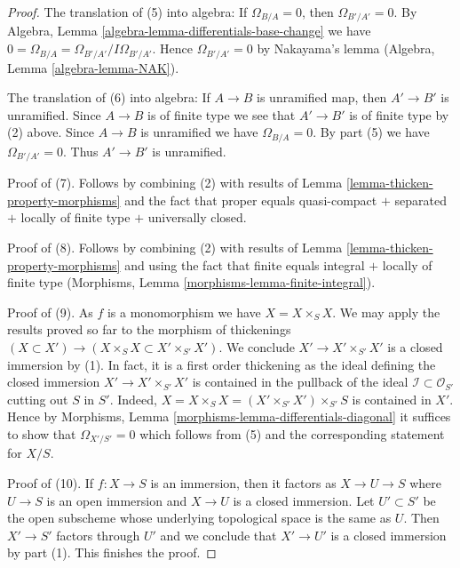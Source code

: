 \documentclass[10pt,a4paper]{amsart}
\theoremstyle{plain}
\theoremstyle{definition}
\theoremstyle{remark}
\numberwithin{equation}{subsection}
\begin{document}
\begin{proof}
\medskip\noindent
The translation of (5) into algebra: If $\Omega_{B/A} = 0$, then
$\Omega_{B'/A'} = 0$. By
Algebra, Lemma \ref{algebra-lemma-differentials-base-change}
we have $0 = \Omega_{B/A} = \Omega_{B'/A'}/I\Omega_{B'/A'}$.
Hence $\Omega_{B'/A'} = 0$ by
Nakayama's lemma (Algebra, Lemma \ref{algebra-lemma-NAK}).

\medskip\noindent
The translation of (6) into algebra: If $A \to B$ is unramified
map, then $A' \to B'$ is unramified. Since $A \to B$ is of finite
type we see that $A' \to B'$ is of finite type by (2) above.
Since $A \to B$ is unramified we have $\Omega_{B/A} = 0$. By
part (5) we have $\Omega_{B'/A'} = 0$. Thus $A' \to B'$ is unramified.

\medskip\noindent
Proof of (7). Follows by combining (2) with
results of Lemma \ref{lemma-thicken-property-morphisms}
and the fact that proper equals quasi-compact $+$
separated $+$ locally of finite type $+$ universally closed.

\medskip\noindent
Proof of (8). Follows by combining (2) with
results of Lemma \ref{lemma-thicken-property-morphisms}
and using the fact that finite equals integral $+$ locally
of finite type (Morphisms, Lemma \ref{morphisms-lemma-finite-integral}).

\medskip\noindent
Proof of (9). As $f$ is a monomorphism we have $X = X \times_S X$.
We may apply the results proved so far to the morphism of thickenings
$(X \subset X') \to (X \times_S X \subset X' \times_{S'} X')$.
We conclude $X' \to X' \times_{S'} X'$ is a closed immersion by (1).
In fact, it is a first order thickening as the ideal defining the
closed immersion
$X' \to X' \times_{S'} X'$ is contained in the pullback of the ideal
$\mathcal{I} \subset \mathcal{O}_{S'}$ cutting out $S$ in $S'$.
Indeed, $X = X \times_S X = (X' \times_{S'} X') \times_{S'} S$
is contained in $X'$. Hence by
Morphisms, Lemma \ref{morphisms-lemma-differentials-diagonal}
it suffices to show that
$\Omega_{X'/S'} = 0$ which follows from (5)
and the corresponding statement for $X/S$.

\medskip\noindent
Proof of (10). If $f : X \to S$ is an immersion, then it factors as
$X \to U \to S$ where $U \to S$ is an open immersion and $X \to U$ is a
closed immersion. Let $U' \subset S'$ be the open subscheme whose
underlying topological space is the same as $U$. Then $X' \to S'$
factors through $U'$ and we conclude that $X' \to U'$ is a closed
immersion by part (1). This finishes the proof.
\end{proof}
\end{document}
